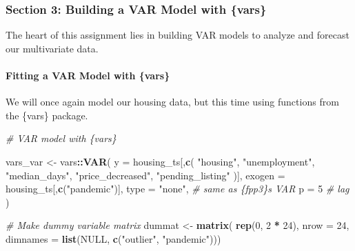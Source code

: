\documentclass[
]{article}
\newenvironment{Shaded}{\begin{snugshade}}{\end{snugshade}}
\newcommand{\AttributeTok}[1]{\textcolor[rgb]{0.13,0.29,0.53}{#1}}
\newcommand{\CommentTok}[1]{\textcolor[rgb]{0.56,0.35,0.01}{\textit{#1}}}
\newcommand{\ConstantTok}[1]{\textcolor[rgb]{0.56,0.35,0.01}{#1}}
\newcommand{\DecValTok}[1]{\textcolor[rgb]{0.00,0.00,0.81}{#1}}
\newcommand{\FunctionTok}[1]{\textcolor[rgb]{0.13,0.29,0.53}{\textbf{#1}}}
\newcommand{\NormalTok}[1]{#1}
\newcommand{\OtherTok}[1]{\textcolor[rgb]{0.56,0.35,0.01}{#1}}
\newcommand{\SpecialCharTok}[1]{\textcolor[rgb]{0.81,0.36,0.00}{\textbf{#1}}}
\newcommand{\StringTok}[1]{\textcolor[rgb]{0.31,0.60,0.02}{#1}}
\begin{document}
\hypertarget{section-3-building-a-var-model-with-vars}{%
\subsubsection{Section 3: Building a VAR Model with
\{vars\}}\label{section-3-building-a-var-model-with-vars}}

The heart of this assignment lies in building VAR models to analyze and
forecast our multivariate data.

\hypertarget{fitting-a-var-model-with-vars}{%
\paragraph{Fitting a VAR Model with
\{vars\}}\label{fitting-a-var-model-with-vars}}

We will once again model our housing data, but this time using functions
from the \{vars\} package.

\begin{Shaded}
\begin{Highlighting}[]
\CommentTok{\# VAR model with \{vars\}}

\NormalTok{vars\_var }\OtherTok{\textless{}{-}}\NormalTok{ vars}\SpecialCharTok{::}\FunctionTok{VAR}\NormalTok{(}
  \AttributeTok{y =}\NormalTok{ housing\_ts[,}\FunctionTok{c}\NormalTok{(}
    \StringTok{"housing"}\NormalTok{, }\StringTok{"unemployment"}\NormalTok{, }\StringTok{"median\_days"}\NormalTok{,}
    \StringTok{"price\_decreased"}\NormalTok{, }\StringTok{"pending\_listing"}
\NormalTok{  )],}
  \AttributeTok{exogen =}\NormalTok{ housing\_ts[,}\FunctionTok{c}\NormalTok{(}\StringTok{"pandemic"}\NormalTok{)],}
  \AttributeTok{type =} \StringTok{"none"}\NormalTok{, }\CommentTok{\# same as \{fpp3\}\textquotesingle{}s \textasciigrave{}VAR\textasciigrave{}}
  \AttributeTok{p =} \DecValTok{5} \CommentTok{\# lag}
\NormalTok{)}

\CommentTok{\# Make dummy variable matrix}
\NormalTok{dummat }\OtherTok{\textless{}{-}} \FunctionTok{matrix}\NormalTok{(}
  \FunctionTok{rep}\NormalTok{(}\DecValTok{0}\NormalTok{, }\DecValTok{2} \SpecialCharTok{*} \DecValTok{24}\NormalTok{), }\AttributeTok{nrow =} \DecValTok{24}\NormalTok{,}
  \AttributeTok{dimnames =} \FunctionTok{list}\NormalTok{(}\ConstantTok{NULL}\NormalTok{, }\FunctionTok{c}\NormalTok{(}\StringTok{"outlier"}\NormalTok{, }\StringTok{"pandemic"}\NormalTok{)))}
\end{Highlighting}
\end{Shaded}
\end{document}
